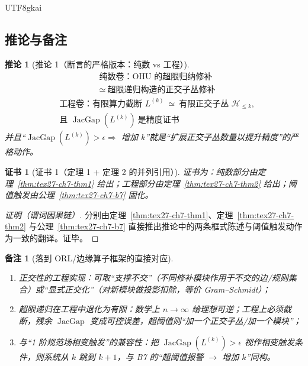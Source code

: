 \documentclass[12pt]{article}
\newtheorem{corollary}{推论}[section]
\newtheorem{remark}{备注}[section]
\newtheorem{Certificate}{证书}[section]
\newcommand{\JacGap}{\operatorname{JacGap}}
\begin{document}
\begin{CJK*}{UTF8}{gkai}
\subsection{推论与备注}
\label{subsec:tex27-ch7-others}

\begin{corollary}[推论 1（断言的严格版本：纯数 vs 工程）]
\label{cor:tex27-ch7-c1}
\[
  \boxed{\begin{aligned}
    &\text{纯数卷：OHU 的超限归纳修补}\\
    &\simeq\ \text{超限递归构造的正交子丛修补}
  \end{aligned}}
\]
\[
  \boxed{\begin{aligned}
    &\text{工程卷：有限算力截断 }L^{(k)}
    \ \simeq\ \text{有限正交子丛 }\mathcal{H}_{\le k},\\
    &\text{且 }\JacGap(L^{(k)})\ \text{是精度证书}
  \end{aligned}}
\]
并且“$\JacGap(L^{(k)})>\epsilon\Rightarrow$ 增加 $k$”就是“扩展正交子丛数量以提升精度”的严格动作。
\end{corollary}

\begin{Certificate}[证书 1（定理 1 + 定理 2 的并列引用）]
\label{cert:tex27-ch7-c1}
证书为：纯数部分由定理~\ref{thm:tex27-ch7-thm1} 给出；工程部分由定理~\ref{thm:tex27-ch7-thm2} 给出；阈值触发由公理~\ref{thm:tex27-ch7-b7} 固化。
\end{Certificate}

\begin{proof}[证明（谓词因果链）]
分别由定理~\ref{thm:tex27-ch7-thm1}、定理~\ref{thm:tex27-ch7-thm2} 与公理~\ref{thm:tex27-ch7-b7} 直接推出推论中的两条框式陈述与阈值触发动作为一致的翻译。证毕。
\end{proof}

\begin{remark}[落到 ORL/边缘算子框架的直接对应]
\begin{enumerate}
  \item 正交性的工程实现：可取“支撑不交”（不同修补模块作用于不交的边/规则集合）或“显式正交化”（对新模块做投影扣除，等价 Gram--Schmidt）；
  \item 超限递归在工程中退化为有限：数学上 $n\to\infty$ 给理想可逆；工程上必须截断，残余 $\JacGap$ 变成可控误差，超阈值则“加一个正交子丛/加一个模块”；
  \item 与“1 阶规范场相变触发”的兼容性：把 $\JacGap(L^{(k)})>\epsilon$ 视作相变触发条件，则系统从 $k$ 跳到 $k+1$，与 B7 的“超阈值报警 $\to$ 增加 $k$”同构。
\end{enumerate}
\end{remark}


\end{CJK*}
\end{document}
